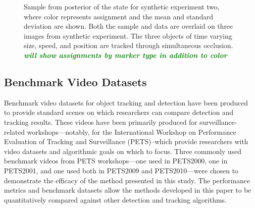 \documentclass[smallcondensed, final]{svjour3}
\newcommand{\willie}[1]{\textcolor{green}{\textsf{\emph{\textbf{\textcolor{green}{#1}}}}}}
\begin{document}
\begin{figure}[h]
        \caption{\label{fig:synth2_alphaimg} Sample from posterior of the state for synthetic experiment two, where color represents assignment and the mean and standard deviation are shown. Both the sample and data are overlaid on three images from synthetic experiment. The three objects of time varying size, speed, and position are tracked through simultaneous occlusion.  \willie{will show assignments by marker type in addition to color}}
\end{figure}





\subsection{Benchmark Video Datasets}

Benchmark video datasets for object tracking and detection have been produced to provide standard scenes on which researchers can compare detection and tracking results. These videos have been primarily produced for surveillance-related workshops---notably, for the International Workshop on Performance Evaluation of Tracking and Surveillance (PETS)--which provide researchers with video datasets and algorithmic goals on which to focus. Three commonly used benchmark videos from PETS workshops---one used in PETS2000, one in PETS2001, and one used both in PETS2009 and PETS2010---were chosen to demonstrate the efficacy of the method presented in this study. The performance metrics and benchmark datasets allow the methods developed in this paper to be quantitatively compared against other detection and tracking algorithms.
\end{document}
